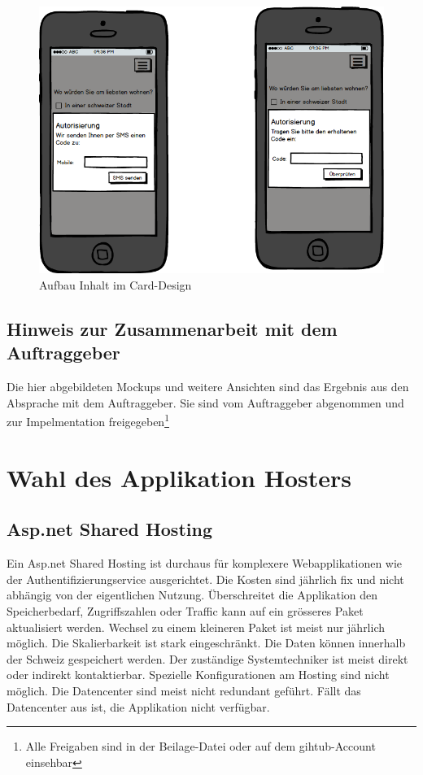 \begin{figure}[htbp]
\centering
\includegraphics{images/mockups/Kundenimplementation-Mobile.png}
\caption{Aufbau Inhalt im Card-Design}
\end{figure}

\subsection{Hinweis zur Zusammenarbeit mit dem
Auftraggeber}\label{hinweis-zur-zusammenarbeit-mit-dem-auftraggeber}

Die hier abgebildeten Mockups und weitere Ansichten sind das Ergebnis
aus den Absprache mit dem Auftraggeber. Sie sind vom Auftraggeber
abgenommen und zur Impelmentation freigegeben\footnote{Alle Freigaben
  sind in der Beilage-Datei oder auf dem gihtub-Account einsehbar
  \newpage}

\section{Wahl des Applikation
Hosters}\label{wahl-des-applikation-hosters}

\subsection{Asp.net Shared Hosting}\label{asp.net-shared-hosting}

Ein Asp.net Shared Hosting ist durchaus für komplexere Webapplikationen
wie der Authentifizierungservice ausgerichtet. Die Kosten sind jährlich
fix und nicht abhängig von der eigentlichen Nutzung. Überschreitet die
Applikation den Speicherbedarf, Zugriffszahlen oder Traffic kann auf ein
grösseres Paket aktualisiert werden. Wechsel zu einem kleineren Paket
ist meist nur jährlich möglich. Die Skalierbarkeit ist stark
eingeschränkt. Die Daten können innerhalb der Schweiz gespeichert
werden. Der zuständige Systemtechniker ist meist direkt oder indirekt
kontaktierbar. Spezielle Konfigurationen am Hosting sind nicht möglich.
Die Datencenter sind meist nicht redundant geführt. Fällt das
Datencenter aus ist, die Applikation nicht verfügbar.

